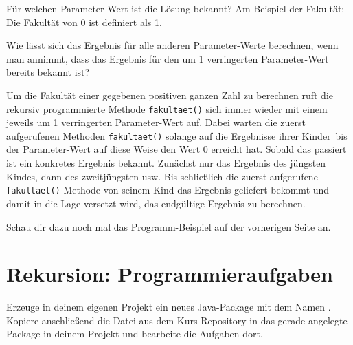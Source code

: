 \begin{compactenum}[1.]
\item Für welchen Parameter-Wert ist die Lösung bekannt? Am Beispiel der
Fakultät: Die Fakultät von 0 ist definiert als 1.
\item Wie lässt sich das Ergebnis für alle anderen Parameter-Werte berechnen,
wenn man annimmt, dass das Ergebnis für den um 1 verringerten Parameter-Wert
bereits bekannt ist?
\end{compactenum}

Um die Fakultät einer gegebenen positiven ganzen Zahl zu berechnen ruft die
rekursiv programmierte Methode \lstinline|fakultaet()| sich immer wieder mit
einem jeweils um 1 verringerten Parameter-Wert auf. Dabei warten die zuerst
aufgerufenen Methoden \lstinline|fakultaet()| solange auf die Ergebnisse ihrer
\glqq Kinder\grqq\ bis der Parameter-Wert auf diese Weise den Wert 0 erreicht
hat. Sobald das passiert ist ein konkretes Ergebnis bekannt. Zunächst nur das
Ergebnis des \glqq jüngsten Kindes\grqq , dann des zweitjüngsten usw. Bis
schließlich die zuerst aufgerufene \lstinline|fakultaet()|-Methode von seinem
Kind das Ergebnis geliefert bekommt und damit in die Lage versetzt wird, das
endgültige Ergebnis zu berechnen.

Schau dir dazu noch mal das Programm-Beispiel auf der vorherigen Seite an.


\clearpage

\rehead[]{\textcolor{lightblue}{AvHG, Inf, My}}
\lohead[]{\textcolor{lightblue}{AvHG, Inf, My}}

\section{Rekursion: Programmieraufgaben}

Erzeuge in deinem eigenen Projekt ein neues Java-Package mit dem Namen
. Kopiere anschließend die Datei 
aus dem Kurs-Repository in das gerade angelegte Package in deinem Projekt und bearbeite
die Aufgaben dort.

